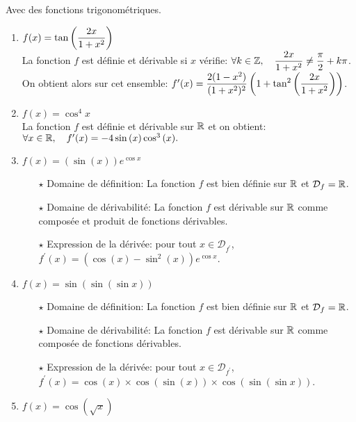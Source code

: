 \documentclass[a4paper, 11pt,reqno]{article}
\begin{document}
\begin{correction}  \; Avec des fonctions trigonom\'etriques.\\
	\begin{enumerate}
		\item $f(x)=\tan{\left( \displaystyle\frac{2x}{1+x^2} \right)}$\\
		      La fonction $f$ est d\'efinie et d\'erivable si $x$ v\'erifie: $\forall k\in\mathbb{Z},\quad \displaystyle\frac{2x}{1+x^2}\not= \displaystyle\frac{\pi}{2}+k\pi$. On obtient alors sur cet ensemble: $f^{\prime}(x)=\displaystyle\frac{2(1-x^2)}{(1+x^2)^2}\left( 1+\tan^2{\left( \displaystyle\frac{2x}{1+x^2} \right)} \right)$.
		\item $f(x)=\cos^4{x}$\\
		      La fonction $f$ est d\'efinie et d\'erivable sur $\mathbb{R}$ et on obtient: $\forall x\in\mathbb{R},\quad f^{\prime}(x)=-4\sin{(x)}\cos^3{(x)}.$
		\item $f(x)=(\sin{(x)})e^{\cos{x}}$\\
		      \begin{itemize}
			      \item[$\star$] Domaine de d\'efinition: La fonction $f$ est bien d\'efinie sur $\mathbb{R}$ et $\mathcal{D}_f=\mathbb{R}$.
			      \item[$\star$] Domaine de d\'erivabilit\'e: La fonction $f$ est d\'erivable sur $\mathbb{R}$ comme compos\'ee et produit de fonctions d\'erivables.
			      \item[$\star$] Expression de la d\'eriv\'ee: pour tout $x\in\mathcal{D}_{f^{\prime}}$, $f^{\prime}(x)=\left( \cos{(x)}-\sin^2{(x)}  \right)e^{\cos{x}}$.
		      \end{itemize}
		\item $f(x)=\sin{(\sin{(\sin{x})})}$\\
		      \begin{itemize}
			      \item[$\star$] Domaine de d\'efinition: La fonction $f$ est bien d\'efinie sur $\mathbb{R}$ et $\mathcal{D}_f=\mathbb{R}$.
			      \item[$\star$] Domaine de d\'erivabilit\'e: La fonction $f$ est d\'erivable sur $\mathbb{R}$ comme compos\'ee de fonctions d\'erivables.
			      \item[$\star$] Expression de la d\'eriv\'ee: pour tout $x\in\mathcal{D}_{f^{\prime}}$, $f^{\prime}(x)=\cos{(x)}\times \cos{(\sin{(x)})}\times \cos{(\sin{(\sin{x})})}$.
		      \end{itemize}
		\item $f(x)=\cos{(\sqrt{x})}$\\
		      \begin{itemize}

\end{itemize}
\end{enumerate}
\end{correction}
\end{document}
